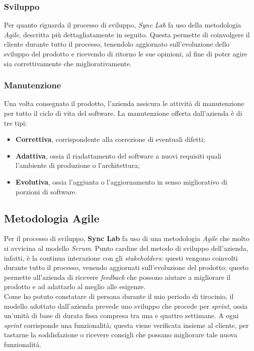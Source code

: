 \subsubsection*{Sviluppo}

Per quanto riguarda il processo di sviluppo, \textit{Sync Lab} fa uso della metodologia \textit{Agile}, descritta più dettagliatamente in seguito. Questa permette di coinvolgere il cliente durante tutto il processo, tenendolo aggiornato sull'evoluzione dello sviluppo del prodotto e ricevendo di ritorno le sue opinioni, al fine di poter agire sia correttivamente che migliorativamente.

\subsubsection*{Manutenzione}

Una volta consegnato il prodotto, l'azienda assicura le attività di manutenzione per tutto il ciclo di vita del software. La manutenzione offerta dall'azienda è di tre tipi:
\begin{itemize}
  \item \textbf{Correttiva}, corrispondente alla correzione di eventuali difetti;
  \item \textbf{Adattiva}, ossia il riadattamento del software a nuovi requisiti quali l'ambiente di produzione o l'architettura;
  \item \textbf{Evolutiva}, ossia l'aggiunta o l'aggiornamento in senso migliorativo di porzioni di software.
\end{itemize}

\subsection{Metodologia Agile}

Per il processo di sviluppo, \textbf{Sync Lab} fa uso di una metodologia \textit{Agile} che molto si avvicina al modello \textit{Scrum}. Punto cardine del metodo di sviluppo dell'azienda, infatti, è la continua interazione con gli \textit{stakeholders}: questi vengono coinvolti durante tutto il processo, venendo aggiornati sull'evoluzione del prodotto; questo permette all'azienda di ricevere \textit{feedback} che possono aiutare a migliorare il prodotto e ad adattarlo al meglio alle esigenze. \\
Come ho potuto constatare di persona durante il mio periodo di tirocinio, il modello adottato dall'azienda prevede uno sviluppo che procede per \textit{sprint}, ossia un'unità di base di durata fissa compresa tra una e quattro settimane. A ogni \textit{sprint} corrisponde una funzionalità; questa viene verificata insieme al cliente, per tastarne la soddisfazione o ricevere consigli che possano migliorare tale nuova funzionalità. \\


